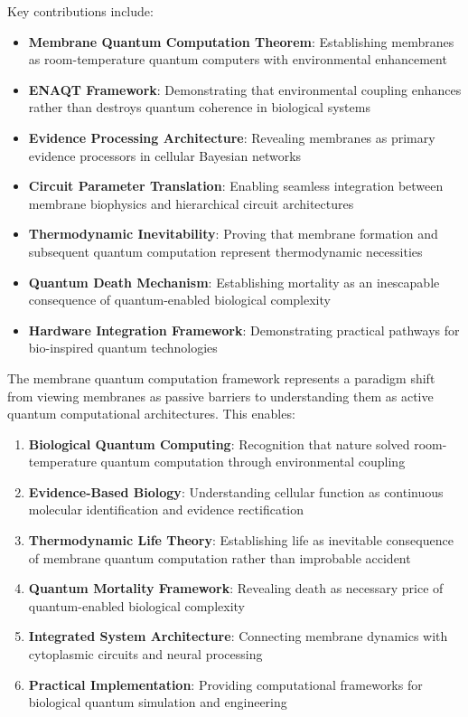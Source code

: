 \documentclass[12pt,a4paper]{article}
\begin{document}
Key contributions include:

\begin{itemize}
\item \textbf{Membrane Quantum Computation Theorem}: Establishing membranes as room-temperature quantum computers with environmental enhancement
\item \textbf{ENAQT Framework}: Demonstrating that environmental coupling enhances rather than destroys quantum coherence in biological systems
\item \textbf{Evidence Processing Architecture}: Revealing membranes as primary evidence processors in cellular Bayesian networks
\item \textbf{Circuit Parameter Translation}: Enabling seamless integration between membrane biophysics and hierarchical circuit architectures
\item \textbf{Thermodynamic Inevitability}: Proving that membrane formation and subsequent quantum computation represent thermodynamic necessities
\item \textbf{Quantum Death Mechanism}: Establishing mortality as an inescapable consequence of quantum-enabled biological complexity
\item \textbf{Hardware Integration Framework}: Demonstrating practical pathways for bio-inspired quantum technologies
\end{itemize}

The membrane quantum computation framework represents a paradigm shift from viewing membranes as passive barriers to understanding them as active quantum computational architectures. This enables:

\begin{enumerate}
\item \textbf{Biological Quantum Computing}: Recognition that nature solved room-temperature quantum computation through environmental coupling
\item \textbf{Evidence-Based Biology}: Understanding cellular function as continuous molecular identification and evidence rectification
\item \textbf{Thermodynamic Life Theory}: Establishing life as inevitable consequence of membrane quantum computation rather than improbable accident
\item \textbf{Quantum Mortality Framework}: Revealing death as necessary price of quantum-enabled biological complexity
\item \textbf{Integrated System Architecture}: Connecting membrane dynamics with cytoplasmic circuits and neural processing
\item \textbf{Practical Implementation}: Providing computational frameworks for biological quantum simulation and engineering
\end{enumerate}
\end{document}
